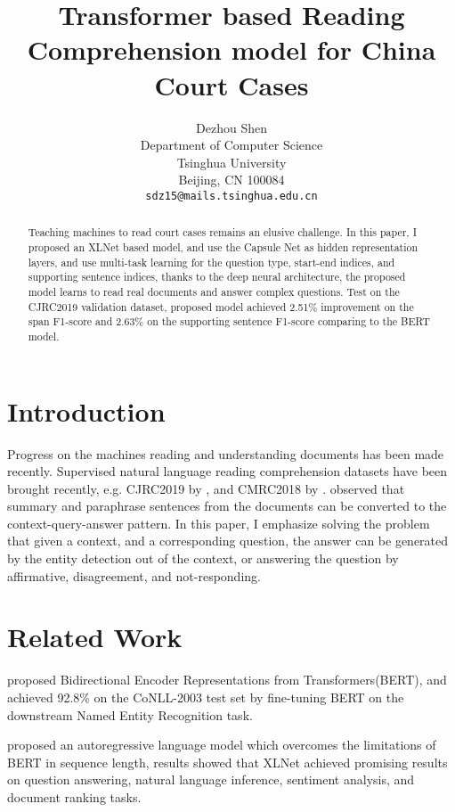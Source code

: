 \documentclass[11pt,a4paper]{article}
\title{Transformer based Reading Comprehension model for China Court Cases}
\author{Dezhou Shen \\
  Department of Computer Science\\
  Tsinghua University\\
  Beijing, CN 100084\\
  \texttt{sdz15@mails.tsinghua.edu.cn} \\}
\date{}
\begin{document}
\maketitle
\begin{abstract}
 Teaching machines to read court cases remains an elusive challenge.
 In this paper, I proposed an XLNet based model, and use the Capsule Net as hidden representation layers,
 and use multi-task learning for the question type, start-end indices, and supporting sentence indices,
 thanks to the deep neural architecture, the proposed model learns to read real documents and answer complex questions.
 Test on the CJRC2019 validation dataset, proposed model achieved 2.51\% improvement on the span F1-score and 2.63\% on the supporting sentence F1-score comparing to the BERT model.

\end{abstract}

\section{Introduction}

  Progress on the machines reading and understanding documents has been made recently.
  Supervised natural language reading comprehension datasets have been brought recently, e.g. CJRC2019 by \citet{duan2019cjrc}, and CMRC2018 by \citet{cui2019span}.
  \citet{Hermann2015Teaching} observed that summary and paraphrase sentences from the documents can be converted to the context-query-answer pattern.
  In this paper, I emphasize solving the problem that given a context, and a corresponding question, the answer can be generated by the entity detection out of the context,
  or answering the question by affirmative, disagreement, and not-responding.

\section{Related Work}

  \citet{devlin2019bert} proposed Bidirectional Encoder Representations from Transformers(BERT), and achieved 92.8\% on the CoNLL-2003 test set by
fine-tuning BERT on the downstream Named Entity Recognition task.

  \citet{yang2019xlnet} proposed an autoregressive language model which overcomes the limitations of BERT in sequence length,
results showed that XLNet achieved promising results on question answering, natural language inference, sentiment analysis, and document ranking tasks.
\end{document}
